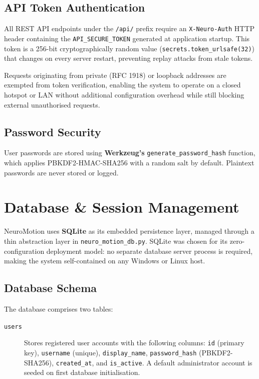 \documentclass[12pt, a4paper, oneside]{report}
\begin{document}
\begin{description}
\subsection{API Token Authentication}

All REST API endpoints under the \texttt{/api/} prefix require an
\texttt{X-Neuro-Auth} HTTP header containing the \texttt{API\_SECURE\_TOKEN} generated
at application startup. This token is a 256-bit cryptographically random value
(\texttt{secrets.token\_urlsafe(32)}) that changes on every server restart,
preventing replay attacks from stale tokens.

Requests originating from private (RFC 1918) or loopback addresses are
exempted from token verification, enabling the system to operate on a closed
hotspot or LAN without additional configuration overhead while still blocking
external unauthorised requests.

\subsection{Password Security}

User passwords are stored using \textbf{Werkzeug's} \texttt{generate\_password\_hash}
function, which applies PBKDF2-HMAC-SHA256 with a random salt by default.
Plaintext passwords are never stored or logged.

\section{Database \& Session Management}
\label{sec:database}

NeuroMotion uses \textbf{SQLite} as its embedded persistence layer, managed through
a thin abstraction layer in \texttt{neuro\_motion\_db.py}. SQLite was chosen for
its zero-configuration deployment model: no separate database server process is
required, making the system self-contained on any Windows or Linux host.

\subsection{Database Schema}

The database comprises two tables:

\begin{description}
  \item[\texttt{users}] Stores registered user accounts with the following columns:
        \texttt{id} (primary key), \texttt{username} (unique), \texttt{display\_name},
        \texttt{password\_hash} (PBKDF2-SHA256), \texttt{created\_at}, and
        \texttt{is\_active}. A default administrator account is seeded on first
        database initialisation.


\end{description}
\end{description}
\end{document}

